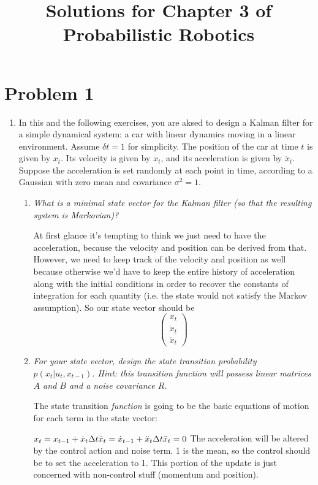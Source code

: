 \documentclass[10pt]{article}
\begin{document}
\title{Solutions for Chapter 3 of Probabilistic Robotics}

\section{Problem 1}
\begin{enumerate}
  \item In this and the following exercises, you are aksed to design a Kalman
filter for a simple dynamical system: a car with linear dynamics moving in a
linear environment. Assume $\delta t = 1$ for simplicity. The position of the
car at time $t$ is given by $x_t$. Its velocity is given by $\dot{x}_t$, and its
acceleration is given by $\ddot{x}_t$. Suppose the acceleration is set
randomly at each point in time, according to a Gaussian with zero mean and
covariance $\sigma^2 = 1$.

  \begin{enumerate}
  \item \textit{What is a minimal state vector for the Kalman filter (so that the
resulting system is Markovian)?} 

At first glance it's tempting to think we just need to have the acceleration,
because the velocity and position can be derived from that.  However, we need to
keep track of the velocity and position as well because otherwise we'd have to
keep the entire history of acceleration along with the initial conditions in
order to recover the constants of integration for each quantity (i.e. the state
would not satisfy the Markov assumption). So our state vector should be
$$ \begin{pmatrix} x_t \\ \dot{x}_t \\ \ddot{x}_t \end{pmatrix} $$

  \item \textit{For your state vector, design the state transition probability 
  $p(x_t | u_t,x_{t-1})$. Hint: this transition function will possess linear
  matrices $A$ and $B$ and a noise covariance $R$.}

  The state transition \textit{function} is going to be the basic equations of
  motion for each term in the state vector:

  \begin{math}
  x_t = x_{t-1} + \dot{x}_t \Delta t \\ 
  \dot{x}_t = \dot{x}_{t-1} + \ddot{x}_t \Delta t \\ 
  \ddot{x}_t = 0\\ 
  \end{math}
  The acceleration will be altered by the control action and noise term. 1 is
  the mean, so the control should be to set the acceleration to 1. This
  portion of the update is just concerned with non-control stuff (momentum and
  position).


\end{enumerate}
\end{enumerate}
\end{document}
